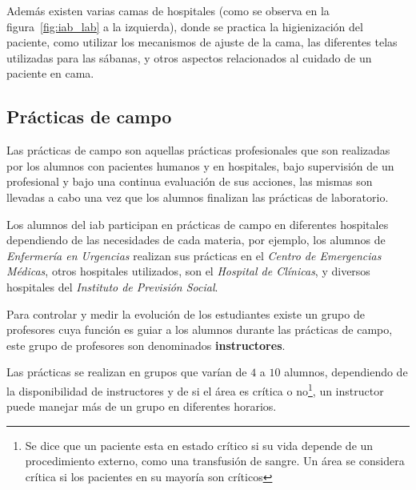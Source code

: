 Además existen varias camas de hospitales (como se observa en la
figura~\ref{fig:iab_lab} a la izquierda), donde se practica la higienización del
paciente, como utilizar los mecanismos de ajuste de la cama, las diferentes
telas utilizadas para las sábanas, y otros aspectos relacionados al cuidado de
un paciente en cama.


\subsection{Prácticas de campo}
\label{sec:practica_hos}

Las prácticas de campo son aquellas prácticas profesionales que son
realizadas por los alumnos con pacientes humanos y en hospitales, bajo
supervisión de un profesional y bajo una continua evaluación de sus
acciones, las mismas son llevadas a cabo una vez que los alumnos finalizan
las prácticas de laboratorio.





Los alumnos del \Gls{iab} participan en prácticas de campo 
en diferentes hospitales dependiendo de las necesidades de cada
materia, por ejemplo, los alumnos de \textit{Enfermería en Urgencias} realizan
sus prácticas en el \textit{Centro de Emergencias Médicas}, otros hospitales
utilizados, son el \textit{Hospital de Clínicas}, y diversos hospitales del
\textit{Instituto de Previsión Social}.


Para controlar y medir la evolución de los estudiantes existe un grupo de
profesores cuya función es guiar a los alumnos durante las prácticas de campo,
este grupo de profesores son denominados \textbf{instructores}.

Las prácticas se realizan en grupos que varían de $4$ a $10$ alumnos, dependiendo de
la disponibilidad de instructores y de si el área es crítica o no\footnote{Se
dice que un paciente esta en estado crítico si su vida depende de un
procedimiento externo, como una transfusión de sangre. Un área se considera
crítica si los pacientes en su mayoría son críticos}, un instructor puede
manejar más de un grupo en diferentes horarios. 


